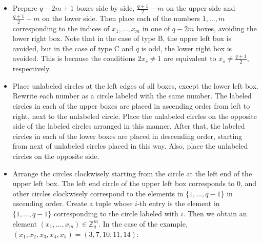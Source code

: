 \documentclass{article}
\theoremstyle{plain}
\theoremstyle{definition}
\theoremstyle{remark}
\numberwithin{equation}{section}
\begin{document}
\begin{itemize}
\item[1.] Prepare $q-2m+1$ boxes side by side, $\displaystyle \frac{q+1}{2}-m$ on the upper side and $\displaystyle \frac{q+1}{2}-m$ on the lower side.
Then place each of the numbers $1,\dots,m$ corresponding to the indices of $x_1,\dots,x_m$ in one of $q-2m$ boxes, avoiding the lower right box.
Note that in the case of type B, the upper left box is avoided, but in the case of type C and $q$ is odd, the lower right box is avoided.
This is because the conditions $2x_s\neq 1$ are equivalent to $\displaystyle x_s\neq \frac{q+1}{2}$, respectively.
\begin{center}
\end{center}
\item[2.]  Place unlabeled circles at the left edges of all boxes, except the lower left box.
Rewrite each number as a circle labeled with the same number.
The labeled circles in each of the upper boxes are placed in ascending order from left to right, next to the unlabeled circle.
Place the unlabeled circles on the opposite side of the labeled circles arranged in this manner.
After that, the labeled circles in each of the lower boxes are placed in descending order, starting from next of unlabeled circles placed in this way.
Also, place the unlabeled circles on the opposite side.
\item[3.] Arrange the circles clockwisely starting from the circle at the left end of the upper left box.
The left end circle of the upper left box corresponds to $0$, and other circles clockwisely correspond to the elements in $\{1,\dots,q-1\}$ in ascending order.
Create a tuple whose $i$-th entry is the element in $\{1,\dots,q-1\}$ corresponding to the circle labeled with $i$.
Then we obtain an element $(x_1,\dots,x_m)\in\mathbb{Z}_q^m$.
In the case of the example, $(x_1,x_2,x_3,x_4,x_5)=(3,7,10,11,14)$: 
\begin{center}

\end{center}
\end{itemize}
\end{document}
